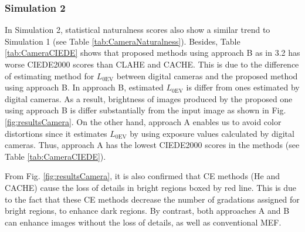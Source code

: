 \documentclass[paper]{ieice}
\begin{document}
\subsubsection{Simulation 2}
  In Simulation 2, statistical naturalness scores also show a similar trend to Simulation 1
  (see Table \ref{tab:CameraNaturalness}).
  Besides, Table \ref{tab:CameraCIEDE} shows that
  proposed methods using approach B as in 3.2
  has worse CIEDE2000 scores than CLAHE and CACHE.
  This is due to the difference of estimating method
  for $L_{0\mathrm{EV}}$ between digital cameras and the proposed method
  using approach B.
  In approach B, estimated $L_{0\mathrm{EV}}$ is differ from ones estimated by digital cameras.
  As a result, brightness of images produced by the proposed one
  using approach B is differ substantially
  from the input image as shown in Fig. \ref{fig:resultsCamera}.
  On the other hand, approach A enables us to avoid color distortions since
  it estimates $L_{0\mathrm{EV}}$ by using exposure values calculated by digital cameras.
  Thus, approach A has the lowest CIEDE2000 scores in the methods
  (see Table \ref{tab:CameraCIEDE}).
  
  From Fig. \ref{fig:resultsCamera},
  it is also confirmed that CE methods
  (He and CACHE) cause
  the loss of details in bright regions boxed by red line.
  This is due to the fact that these CE methods decrease
  the number of gradations assigned for bright regions, to enhance dark regions.
  By contrast, both approaches A and B
  can enhance images without the loss of details,
  as well as conventional MEF.
\end{document}
